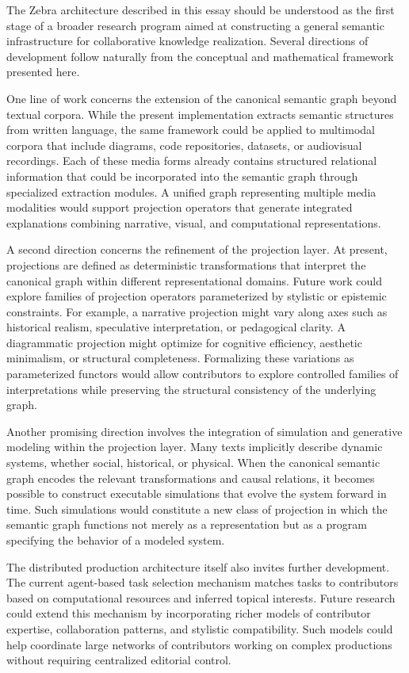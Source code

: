 \documentclass[12pt,a4paper]{article}
\begin{document}
The Zebra architecture described in this essay should be understood as the first stage of a broader research program aimed at constructing a general semantic infrastructure for collaborative knowledge realization. Several directions of development follow naturally from the conceptual and mathematical framework presented here.

One line of work concerns the extension of the canonical semantic graph beyond textual corpora. While the present implementation extracts semantic structures from written language, the same framework could be applied to multimodal corpora that include diagrams, code repositories, datasets, or audiovisual recordings. Each of these media forms already contains structured relational information that could be incorporated into the semantic graph through specialized extraction modules. A unified graph representing multiple media modalities would support projection operators that generate integrated explanations combining narrative, visual, and computational representations.

A second direction concerns the refinement of the projection layer. At present, projections are defined as deterministic transformations that interpret the canonical graph within different representational domains. Future work could explore families of projection operators parameterized by stylistic or epistemic constraints. For example, a narrative projection might vary along axes such as historical realism, speculative interpretation, or pedagogical clarity. A diagrammatic projection might optimize for cognitive efficiency, aesthetic minimalism, or structural completeness. Formalizing these variations as parameterized functors would allow contributors to explore controlled families of interpretations while preserving the structural consistency of the underlying graph.

Another promising direction involves the integration of simulation and generative modeling within the projection layer. Many texts implicitly describe dynamic systems, whether social, historical, or physical. When the canonical semantic graph encodes the relevant transformations and causal relations, it becomes possible to construct executable simulations that evolve the system forward in time. Such simulations would constitute a new class of projection in which the semantic graph functions not merely as a representation but as a program specifying the behavior of a modeled system.

The distributed production architecture itself also invites further development. The current agent-based task selection mechanism matches tasks to contributors based on computational resources and inferred topical interests. Future research could extend this mechanism by incorporating richer models of contributor expertise, collaboration patterns, and stylistic compatibility. Such models could help coordinate large networks of contributors working on complex productions without requiring centralized editorial control.
\end{document}
